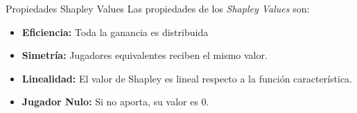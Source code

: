 \begin{frame}{Propiedades Shapley Values}
	Las propiedades de los \textit{Shapley Values} son:
	\begin{itemize}
		\item \textbf{Eficiencia:} Toda la ganancia es distribuida 
		\item \textbf{Simetría:} Jugadores equivalentes reciben el mismo valor.  
		\item \textbf{Linealidad:} El valor de Shapley es lineal respecto a la función característica. 
		\item \textbf{Jugador Nulo:} Si no aporta, su valor es 0.
	\end{itemize}
\end{frame}

